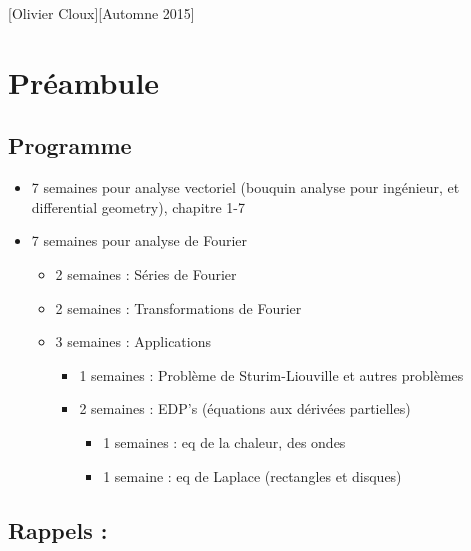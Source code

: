 \documentclass[12pt,a4paper]{article}
\begin{document}
[Olivier Cloux][Automne 2015]
\newpage
\tableofcontents
{}
\newcommand{\dive}{\text{ div }}
\newcommand{\rot}{\text{ rot }}
\newcommand{\grad}{\text{ grad }}
\section{Préambule}
\subsection{Programme}
\begin{itemize}
	\item 	7 semaines pour analyse vectoriel (bouquin analyse pour ingénieur, et differential geometry), chapitre 1-7
	\item 	7 semaines pour analyse de Fourier
			\begin{itemize}
				\item 	2 semaines : Séries de Fourier
				\item 	2 semaines : Transformations de Fourier
				\item 	3 semaines : Applications
						\begin{itemize}
							\item 	1 semaines : Problème de Sturim-Liouville et autres problèmes
							\item 	2 semaines : EDP's (équations aux dérivées partielles)
							\begin{itemize}
								\item	1 semaines : eq de la chaleur, des ondes
								\item 	1 semaine : eq de Laplace (rectangles et disques)
							\end{itemize}
						\end{itemize}
			\end{itemize}
\end{itemize}
\subsection{Rappels :} 
\end{document}
